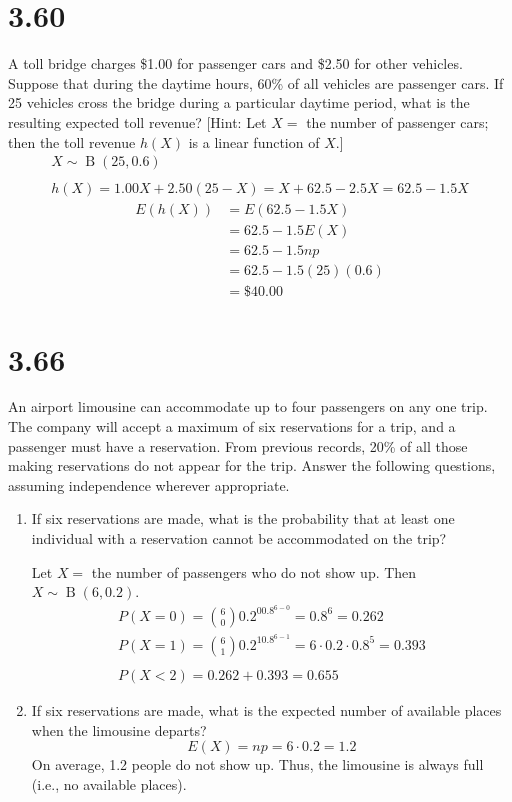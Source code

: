 \documentclass[letterpaper,12pt,fleqn]{article}
\DeclareMathOperator{\bin}{B}
\begin{document}
\section*{3.60}

A toll bridge charges \$1.00 for passenger cars and \$2.50 for other vehicles.  Suppose that during the daytime hours, 60\%
of all vehicles are passenger cars.  If 25 vehicles cross the bridge during a particular daytime period, what is the resulting
expected toll revenue? [Hint: Let \(X=\) the number of passenger cars; then the toll revenue \(h(X)\) is a linear function of
  \(X\).]
\begin{gather*}
  X\sim\bin(25,0.6) \\
  \\
  h(X)=1.00X+2.50(25-X)=X+62.5-2.5X=62.5-1.5X
\end{gather*}
\begin{align*}
  E(h(X)) &= E(62.5-1.5X) \\
  &= 62.5-1.5E(X) \\
  &= 62.5-1.5np \\
  &= 62.5-1.5(25)(0.6) \\
  &= \$40.00
\end{align*}

\section*{3.66}

An airport limousine can accommodate up to four passengers on any one trip.  The company will accept a maximum of six
reservations for a trip, and a passenger must have a reservation.  From previous records, 20\% of all those making reservations
do not appear for the trip.  Answer the following questions, assuming independence wherever appropriate.

\begin{enumerate}[label={\alph*)}]
\item If six reservations are made, what is the probability that at least one individual with a reservation cannot be
  accommodated on the trip?

  Let \(X=\) the number of passengers who do not show up.  Then \(X\sim\bin(6,0.2)\).
  \begin{gather*}
    P(X=0)=\binom{6}{0}0.2^00.8^{6-0}=0.8^6=0.262 \\
    P(X=1)=\binom{6}{1}0.2^10.8^{6-1}=6\cdot0.2\cdot0.8^5=0.393 \\
    \\
    P(X<2)=0.262+0.393=0.655
  \end{gather*}

\item If six reservations are made, what is the expected number of available places when the limousine departs?
  \[E(X)=np=6\cdot0.2=1.2\]
  On average, 1.2 people do not show up.  Thus, the limousine is always full (i.e., no available places).
\end{enumerate}
\end{document}
